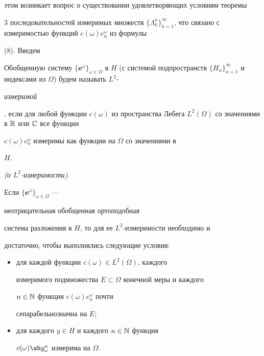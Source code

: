 этом возникает вопрос о существовании удовлетворяющих условиям теоремы


3 последовательностей измеримых множеств $\{\Lambda^n_k\}^\infty_{k=1}


$, что связано с измеримостью функций $c(\omega)e_n^\omega$ из формулы


(8). Введем





\begin{defn}\hspace{-1.8mm}{\bf.}


Обобщенную систему $\{\boldsymbol e^\omega


\}_{\omega\in\Omega}$ в $H$ (с системой подпространств $\{H_n\}_{n=1


}^\infty$ и индексами из $\Omega$) будем называть $L^2$-{\it измеримой


}, если для любой функции $c(\omega)$ из пространства Лебега $L^2


(\Omega)$ со значениями в $\Bbb R$ или $\Bbb C$ все функции


$c(\omega)e_n^\omega$ измеримы как функции на $\Omega$ со значениями в


$H$.


\end{defn}





\begin{thm} {\em (о $L^2$-измеримости)}.


Если $\{\boldsymbol e^\omega\}_{\omega\in\Omega}$ ---


неотрицательная обобщенная ортоподобная


система разложения в $H$, то для ее $L^2$-измеримости необходимо и


достаточно, чтобы выполнялись следующие условия$:$


\begin{itemize}


\item[а)] для каждой функции $c(\omega)\in L^2(\Omega)$, каждого


измеримого подмножества $E\subset\Omega$ конечной меры и каждого


$n\in\Bbb N$ функция $c(\omega)e_n^\omega$ почти


сепарабельнозначна на $E;$


\item[б)] для каждого $y\in H$ и каждого $n\in\Bbb N$ функция


$c(\omega)\wh y_\omega^n$ измерима на $\Omega$.


\end{itemize}


\end{thm}





